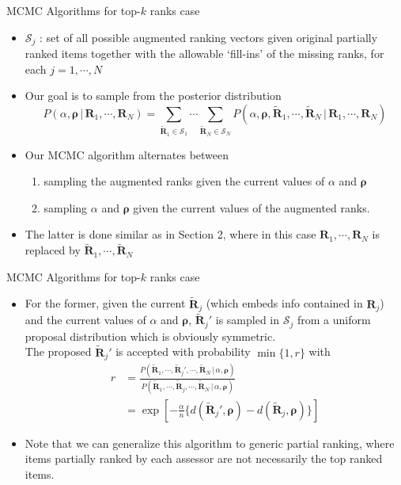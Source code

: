 \documentclass[11pt]{beamer}
\begin{document}
\begin{frame}{MCMC Algorithms for top-$k$ ranks case}
\begin{itemize}
    \item $\mathcal{S}_j$ : set of all possible augmented ranking vectors given original partially ranked items together with the allowable `fill-ins' of the missing ranks, for each $j=1, \cdots, N$
    \item Our goal is to sample from the posterior distribution 
    \begin{equation*}
        P(\alpha, \boldsymbol{\rho}\, |\, \mathbf{R}_1, \cdots, \mathbf{R}_N)=\sum_{\tilde{\mathbf{R}}_1\in \mathcal{S}_1}\cdots \sum_{\tilde{\mathbf{R}}_N\in \mathcal{S}_N}P(\alpha, \boldsymbol{\rho}, \tilde{\mathbf{R}}_1, \cdots,\tilde{\mathbf{R}}_N\, |\, \mathbf{R}_1, \cdots, \mathbf{R}_N )
    \end{equation*}
    \item Our MCMC algorithm alternates between
    \begin{enumerate}
        \item  sampling the augmented ranks given the current values of $\alpha$ and $\boldsymbol{\rho}$
        \item sampling $\alpha$ and $\boldsymbol{\rho}$ given the current values of the augmented ranks.
    \end{enumerate}
    \item The latter is done similar as in Section 2, where in this case $\mathbf{R}_1, \cdots, \mathbf{R}_N$ is replaced by $\tilde{\mathbf{R}}_1, \cdots,\tilde{\mathbf{R}}_N$ 
\end{itemize}
\end{frame}

\begin{frame}{MCMC Algorithms for top-$k$ ranks case}
\begin{itemize}
    \item For the former, given the current $\tilde{\mathbf{R}}_j$ (which embeds info contained in $\mathbf{R}_j$) and the current values of $\alpha$ and $\boldsymbol{\rho}$, $\tilde{\mathbf{R}}_j'$ is sampled in $\mathcal{S}_j$ from a uniform proposal distribution which is obviously symmetric.\\ The proposed $\tilde{\mathbf{R}}_j'$ is accepted with probability $\min\{1,r\}$ with 
    \begin{align*}
        r&= \frac{P(\tilde{\mathbf{R}}_1, \cdots, \tilde{\mathbf{R}}_j',\cdots, \tilde{\mathbf{R}}_N\,|\, \alpha, \boldsymbol{\rho})}{P(\tilde{\mathbf{R}}_1, \cdots, \tilde{\mathbf{R}}_j,\cdots, \tilde{\mathbf{R}}_N\,|\, \alpha, \boldsymbol{\rho})} \\ &=\exp[-\frac{\alpha}{n}\big\{d(\tilde{\mathbf{R}}_j', \boldsymbol{\rho})-d(\tilde{\mathbf{R}}_j, \boldsymbol{\rho}) \big\}] 
    \end{align*}
    \item Note that we can generalize this algorithm to generic partial ranking, where items partially ranked by each assessor are not necessarily the top ranked items. 
\end{itemize}
\end{frame}
\end{document}
